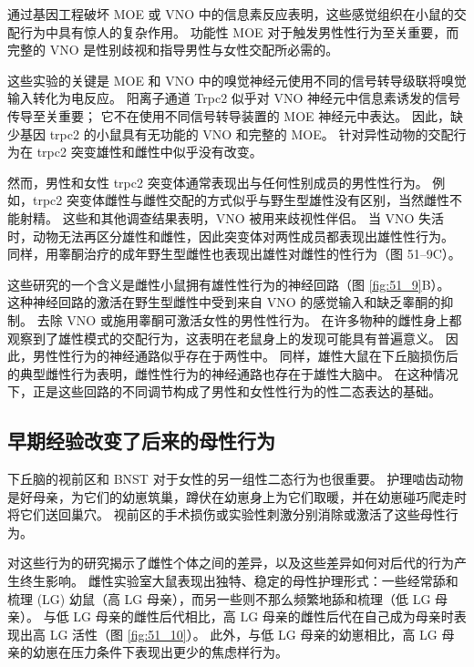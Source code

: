 通过基因工程破坏 MOE 或 VNO 中的信息素反应表明，这些感觉组织在小鼠的交配行为中具有惊人的复杂作用。 功能性 MOE 对于触发男性性行为至关重要，而完整的 VNO 是性别歧视和指导男性与女性交配所必需的。

这些实验的关键是 MOE 和 VNO 中的嗅觉神经元使用不同的信号转导级联将嗅觉输入转化为电反应。 阳离子通道 Trpc2 似乎对 VNO 神经元中信息素诱发的信号传导至关重要； 它不在使用不同信号转导装置的 MOE 神经元中表达。 因此，缺少基因 trpc2 的小鼠具有无功能的 VNO 和完整的 MOE。 针对异性动物的交配行为在 trpc2 突变雄性和雌性中似乎没有改变。

然而，男性和女性 trpc2 突变体通常表现出与任何性别成员的男性性行为。 例如，trpc2 突变体雌性与雌性交配的方式似乎与野生型雄性没有区别，当然雌性不能射精。 这些和其他调查结果表明，VNO 被用来歧视性伴侣。 当 VNO 失活时，动物无法再区分雄性和雌性，因此突变体对两性成员都表现出雄性性行为。 同样，用睾酮治疗的成年野生型雌性也表现出雄性对雌性的性行为（图 51–9C）。

这些研究的一个含义是雌性小鼠拥有雄性性行为的神经回路（图 \ref{fig:51_9}B）。 这种神经回路的激活在野生型雌性中受到来自 VNO 的感觉输入和缺乏睾酮的抑制。 去除 VNO 或施用睾酮可激活女性的男性性行为。 在许多物种的雌性身上都观察到了雄性模式的交配行为，这表明在老鼠身上的发现可能具有普遍意义。 因此，男性性行为的神经通路似乎存在于两性中。 同样，雄性大鼠在下丘脑损伤后的典型雌性行为表明，雌性性行为的神经通路也存在于雄性大脑中。 在这种情况下，正是这些回路的不同调节构成了男性和女性性行为的性二态表达的基础。

\subsection{早期经验改变了后来的母性行为}
下丘脑的视前区和 BNST 对于女性的另一组性二态行为也很重要。 护理啮齿动物是好母亲，为它们的幼崽筑巢，蹲伏在幼崽身上为它们取暖，并在幼崽碰巧爬走时将它们送回巢穴。 视前区的手术损伤或实验性刺激分别消除或激活了这些母性行为。

对这些行为的研究揭示了雌性个体之间的差异，以及这些差异如何对后代的行为产生终生影响。 雌性实验室大鼠表现出独特、稳定的母性护理形式：一些经常舔和梳理 (LG) 幼鼠（高 LG 母亲），而另一些则不那么频繁地舔和梳理（低 LG 母亲）。 与低 LG 母亲的雌性后代相比，高 LG 母亲的雌性后代在自己成为母亲时表现出高 LG 活性（图 \ref{fig:51_10}）。 此外，与低 LG 母亲的幼崽相比，高 LG 母亲的幼崽在压力条件下表现出更少的焦虑样行为。

